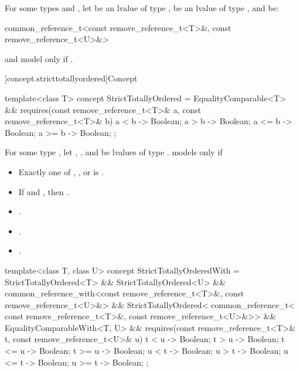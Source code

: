 \begin{itemdescr}
\pnum
For some types  and ,
let  be an lvalue of type ,
 be an lvalue of type ,
and  be:
\begin{codeblock}
common_reference_t<const remove_reference_t<T>&, const remove_reference_t<U>&>
\end{codeblock}
 and  model
 only if
.
\end{itemdescr}

[concept.stricttotallyordered]{Concept }

%
\begin{itemdecl}
template<class T>
  concept StrictTotallyOrdered =
    EqualityComparable<T> &&
    requires(const remove_reference_t<T>& a,
             const remove_reference_t<T>& b) {
      { a <  b } -> Boolean;
      { a >  b } -> Boolean;
      { a <= b } -> Boolean;
      { a >= b } -> Boolean;
    };
\end{itemdecl}

\begin{itemdescr}
\pnum
For some type , let , , and  be
lvalues of type .
 models  only if

\begin{itemize}
\item Exactly one of , , or
       is .
\item If  and , then
      .
\item {}.
\item {}.
\item {}.
\end{itemize}

\end{itemdescr}

\begin{itemdecl}
template<class T, class U>
  concept StrictTotallyOrderedWith =
    StrictTotallyOrdered<T> && StrictTotallyOrdered<U> &&
    common_reference_with<const remove_reference_t<T>&, const remove_reference_t<U>&> &&
    StrictTotallyOrdered<
      common_reference_t<
        const remove_reference_t<T>&,
        const remove_reference_t<U>&>> &&
    EqualityComparableWith<T, U> &&
    requires(const remove_reference_t<T>& t,
             const remove_reference_t<U>& u) {
      { t <  u } -> Boolean;
      { t >  u } -> Boolean;
      { t <= u } -> Boolean;
      { t >= u } -> Boolean;
      { u <  t } -> Boolean;
      { u >  t } -> Boolean;
      { u <= t } -> Boolean;
      { u >= t } -> Boolean;
    };
\end{itemdecl}

